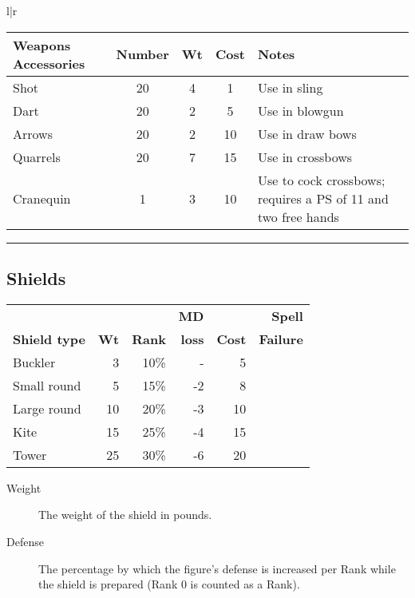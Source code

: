 \begin{tabular}[t]{l|r}
\begin{minipage}[t]{4.6in}
\renewcommand{\thefootnote}{\Alph{footnote}}
\begin{tabularx}{\linewidth}[t]{lcccX}
\textbf{Weapons Accessories}\footnotemark & \tiny\textbf{Number} &
\tiny\textbf{Wt} & \tiny\textbf{Cost} & \tiny\textbf{Notes} \\ \hline
Shot		& 20 & 4 & 1 & Use in sling \\ \hline
Dart		& 20 & 2 & 5 & Use in blowgun \\ \hline
Arrows		& 20 & 2 & 10 & Use in draw bows \\ \hline
Quarrels	& 20 & 7 & 15 & Use in crossbows \\ \hline
Cranequin	& 1 & 3 & 10 & Use to cock crossbows; requires a PS of
11 and two free hands \\
\end{tabularx}

\smallskip

\rule[2.0mm]{\linewidth}{1.0mm}

\subsection{Shields}
\label{tables:shields}

\begin{tabularx}{\linewidth}{Xrrrrr}
	 &	&  & \textbf{MD} &  & \textbf{Spell} \\
\textbf{Shield type} & \textbf{Wt} & \textbf{Rank} &
\textbf{loss} & \textbf{Cost} & \textbf{Failure}\\ \hline
Buckler		& 3	& 10\%	& -	& 5 \\ \hline
Small round	& 5	& 15\%	& -2	& 8 \\ \hline
Large round	& 10	& 20\%	& -3	& 10 \\ \hline
Kite		& 15	& 25\%	& -4	& 15 \\ \hline
Tower		& 25	& 30\%	& -6	& 20 \\ \hline
\end{tabularx}

\smallskip

\begin{multicols}{2}
{\setlength\leftmargini{0pt}
\begin{description}
\item[Weight] The weight of the shield in pounds.

\item[Defense] The percentage by which the figure's defense is
increased per Rank while the shield is prepared (Rank 0 is counted as
a Rank).


\end{description}}
\end{multicols}
\end{minipage}
\end{tabular}
